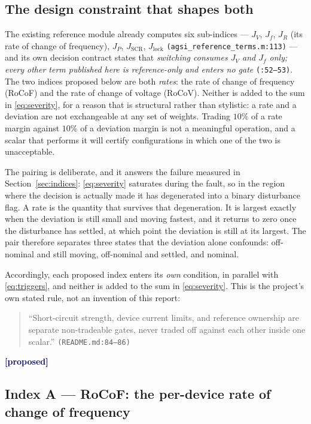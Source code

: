 \documentclass[12pt,a4paper]{article}
\theoremstyle{remark}
\newcommand{\code}[1]{\texttt{\small #1}}
\newcommand{\proposed}{\textcolor{navy}{\textbf{[proposed]}}}
\begin{document}
\subsection{The design constraint that shapes both}

The existing reference module already computes six sub-indices --- $J_V$, $J_f$,
$J_R$ (its rate of change of frequency), $J_P$, $J_{\text{SCR}}$,
$J_{\text{lock}}$ \code{(agsi\_reference\_terms.m:113)} --- and its own decision
contract states that \emph{switching consumes $J_V$ and $J_f$ only; every other
term published here is reference-only and enters no gate} \code{(:52--53)}. The
two indices proposed below are both \emph{rates}: the rate of change of frequency
(RoCoF) and the rate of change of voltage (RoCoV). Neither is added to the sum in
\eqref{eq:severity}, for a reason that is structural rather than stylistic: a
rate and a deviation are not exchangeable at any set of weights. Trading $10\%$
of a rate margin against $10\%$ of a deviation margin is not a meaningful
operation, and a scalar that performs it will certify configurations in which one
of the two is unacceptable.

The pairing is deliberate, and it answers the failure measured in
Section~\ref{sec:indices}: \eqref{eq:severity} saturates during the fault, so in
the region where the decision is actually made it has degenerated into a binary
disturbance flag. A rate is the quantity that survives that degeneration. It is
largest exactly when the deviation is still small and moving fastest, and it
returns to zero once the disturbance has settled, at which point the deviation is
still at its largest. The pair therefore separates three states that the
deviation alone confounds: off-nominal and still moving, off-nominal and settled,
and nominal.

Accordingly, each proposed index enters its \emph{own} condition, in parallel
with \eqref{eq:triggers}, and neither is added to the sum in
\eqref{eq:severity}. This is the project's own stated rule, not an invention of
this report:

\begin{quote}\small
``Short-circuit strength, device current limits, and reference ownership are
separate non-tradeable gates, never traded off against each other inside one
scalar.'' \code{\hfill(README.md:84--86)}
\end{quote}
\proposed

\subsection{Index A --- RoCoF: the per-device rate of change of frequency}
\end{document}
